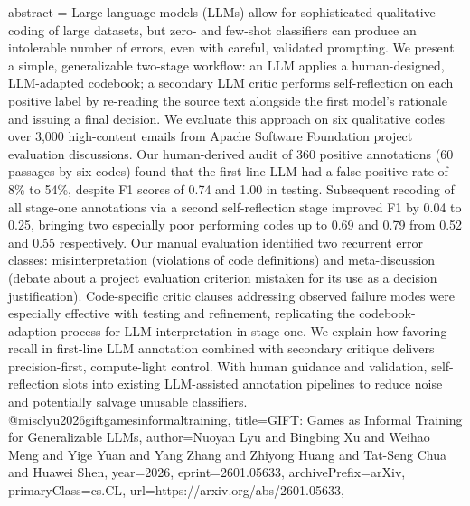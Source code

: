 {      abstract = {Large language models (LLMs) allow for sophisticated qualitative coding of large datasets, but zero- and few-shot classifiers can produce an intolerable number of errors, even with careful, validated prompting. We present a simple, generalizable two-stage workflow: an LLM applies a human-designed, LLM-adapted codebook; a secondary LLM critic performs self-reflection on each positive label by re-reading the source text alongside the first model's rationale and issuing a final decision. We evaluate this approach on six qualitative codes over 3,000 high-content emails from Apache Software Foundation project evaluation discussions. Our human-derived audit of 360 positive annotations (60 passages by six codes) found that the first-line LLM had a false-positive rate of 8\% to 54\%, despite F1 scores of 0.74 and 1.00 in testing. Subsequent recoding of all stage-one annotations via a second self-reflection stage improved F1 by 0.04 to 0.25, bringing two especially poor performing codes up to 0.69 and 0.79 from 0.52 and 0.55 respectively. Our manual evaluation identified two recurrent error classes: misinterpretation (violations of code definitions) and meta-discussion (debate about a project evaluation criterion mistaken for its use as a decision justification). Code-specific critic clauses addressing observed failure modes were especially effective with testing and refinement, replicating the codebook-adaption process for LLM interpretation in stage-one. We explain how favoring recall in first-line LLM annotation combined with secondary critique delivers precision-first, compute-light control. With human guidance and validation, self-reflection slots into existing LLM-assisted annotation pipelines to reduce noise and potentially salvage unusable classifiers.}
}@misc{lyu2026giftgamesinformaltraining,
      title={GIFT: Games as Informal Training for Generalizable LLMs}, 
      author={Nuoyan Lyu and Bingbing Xu and Weihao Meng and Yige Yuan and Yang Zhang and Zhiyong Huang and Tat-Seng Chua and Huawei Shen},
      year={2026},
      eprint={2601.05633},
      archivePrefix={arXiv},
      primaryClass={cs.CL},
      url={https://arxiv.org/abs/2601.05633},
}

